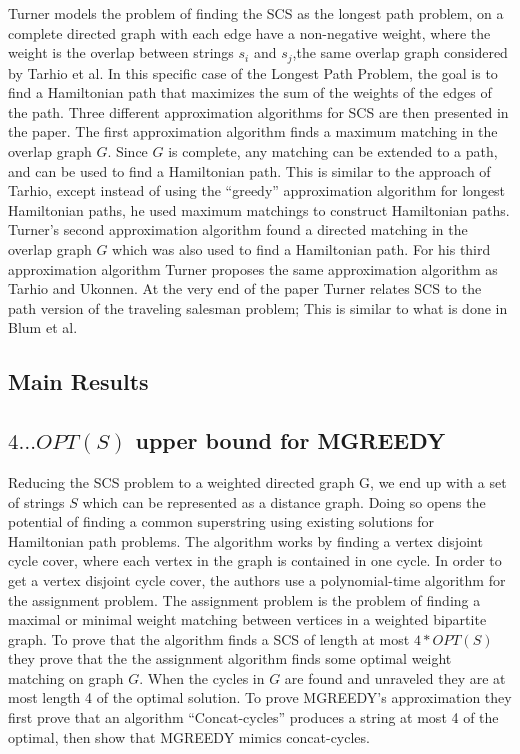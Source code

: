 \documentclass[letterpaper,11pt,titlepage]{article}
\begin{document}
Turner models the problem of finding the SCS as the longest path problem, on a complete directed graph with each edge have a non-negative weight, where the weight is the overlap between strings $s_i$ and $s_j$,the same overlap graph considered by Tarhio et al.  In this specific case of the Longest Path Problem, the goal is to find a Hamiltonian path that maximizes the sum of the weights of the edges of the path. 
Three different approximation algorithms for SCS are then presented in the paper. The first approximation algorithm finds a maximum matching in the overlap graph $G$.  Since $G$ is complete, any matching can be extended to a path, and can be used to find a Hamiltonian path.  This is similar to the approach of Tarhio, except instead of using the ``greedy'' approximation algorithm for longest Hamiltonian paths, he used maximum matchings to construct Hamiltonian paths.  Turner's second approximation algorithm found a directed matching in the overlap graph $G$ which was also used to find a Hamiltonian path.  For his third approximation algorithm Turner proposes the same approximation algorithm as Tarhio and Ukonnen. At the very end of the paper Turner relates SCS to the path version of the traveling salesman problem; This is similar to what is done in Blum et al. 


\subsection*{Main Results}

\subsection*{$4 \ldots OPT(S)$ upper bound for MGREEDY}

Reducing the SCS problem to a weighted directed  graph G, we end up with a set of strings $S$ which can be represented as a distance graph. Doing so opens the potential of finding a common superstring using existing solutions for Hamiltonian path problems. The algorithm works by finding a vertex disjoint cycle cover, where each vertex in the graph is contained in one cycle. In order to get a vertex disjoint cycle cover, the authors use a polynomial-time algorithm for the assignment problem. The assignment problem is the problem of finding a maximal or minimal weight matching between vertices in a weighted bipartite graph. To prove that the algorithm finds a SCS of length at most $4 * OPT(S)$ they prove that the the assignment algorithm finds some optimal weight matching on graph $G$. When the cycles in $G$ are found and unraveled they are at most length 4 of the optimal solution. To prove MGREEDY's approximation they first prove that an algorithm ``Concat-cycles'' produces a string at most 4 of the optimal, then show that MGREEDY mimics concat-cycles.
\end{document}
